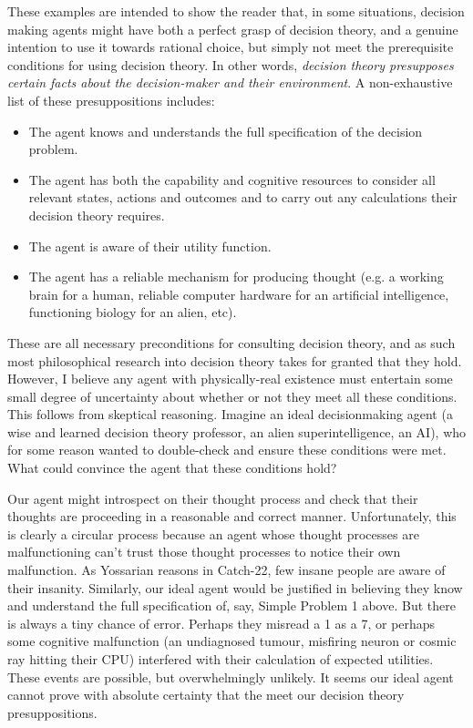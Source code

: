 \documentclass{article}
\begin{document}
These examples are intended to show the reader that, in some situations, decision making agents might have both a perfect grasp of decision theory, and a genuine intention to use it towards rational choice, but simply not meet the prerequisite conditions for using decision theory. In other words, \textit{decision theory presupposes certain facts about the decision-maker and their environment}. A non-exhaustive list of these presuppositions includes:

\begin{itemize}  
\item The agent knows and understands the full specification of the decision problem.
\item The agent has both the capability and cognitive resources to consider all relevant states, actions and outcomes and to carry out any calculations their decision theory requires.
\item The agent is aware of their utility function.
\item The agent has a reliable mechanism for producing thought (e.g. a working brain for a human, reliable computer hardware for an artificial intelligence, functioning biology for an alien, etc).
\end{itemize}

These are all necessary preconditions for consulting decision theory, and as such most philosophical research into decision theory takes for granted that they hold. However, I believe any agent with physically-real existence must entertain some small degree of uncertainty about whether or not they meet all these conditions. This follows from skeptical reasoning. Imagine an ideal decisionmaking agent (a wise and learned decision theory professor, an alien superintelligence, an AI), who for some reason wanted to double-check and ensure these conditions were met. What could convince the agent that these conditions hold?

Our agent might introspect on their thought process and check that their thoughts are proceeding in a reasonable and correct manner. Unfortunately, this is clearly a circular process because an agent whose thought processes are malfunctioning can't trust those thought processes to notice their own malfunction. As Yossarian reasons in Catch-22, few insane people are aware of their insanity. Similarly, our ideal agent would be justified in believing they know and understand the full specification of, say, Simple Problem 1 above. But there is always a tiny chance of error. Perhaps they misread a 1 as a 7, or perhaps some cognitive malfunction (an undiagnosed tumour, misfiring neuron or cosmic ray hitting their CPU) interfered with their calculation of expected utilities. These events are possible, but overwhelmingly unlikely. It seems our ideal agent cannot prove with absolute certainty that the meet our decision theory presuppositions.
\end{document}
